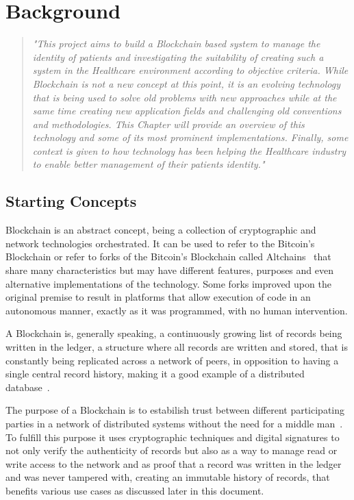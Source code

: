 \chapter{Background}\label{background}


\begin{quote} \emph{"This project aims to build a Blockchain based system to
  manage the identity of patients and investigating the suitability of creating
  such a system in the Healthcare environment according to objective criteria.
  While Blockchain is not a new concept at this point, it is an evolving
  technology that is being used to solve old problems with new approaches while
  at the same time creating new application fields and challenging old
  conventions and methodologies. This Chapter will provide an overview of this
  technology and some of its most prominent implementations. Finally, some
  context is given to how technology has been helping the Healthcare industry
  to enable better management of their patients identity."}
\end{quote}

\section{Starting Concepts}

Blockchain is an abstract concept, being a collection of cryptographic and
network technologies orchestrated. It can be used to refer to the Bitcoin's
Blockchain or refer to forks of the Bitcoin's Blockchain called
Altchains~\cite{Lewis2015} that share many characteristics but may have
different features, purposes and even alternative implementations of the
technology. Some forks improved upon the original premise to result in
platforms that allow execution of code in an autonomous manner, exactly as it
was programmed, with no human intervention.

A Blockchain is, generally speaking, a continuously growing list of records
being written in the ledger, a structure where all records are written and
stored, that is constantly being replicated across a network of peers, in
opposition to having a single central record history, making it a good example
of a distributed database~\cite{Barclay2017}.

The purpose of a Blockchain is to estabilish trust between different
participating parties in a network of distributed systems without the need for
a middle man~\cite{Drescher2017}. To fulfill this purpose it uses cryptographic
techniques and digital signatures to not only verify the authenticity of
records but also as a way to manage read or write access to the network and as
proof that a record was written in the ledger and was never tampered with,
creating an immutable history of records, that benefits various use cases as
discussed later in this document.

